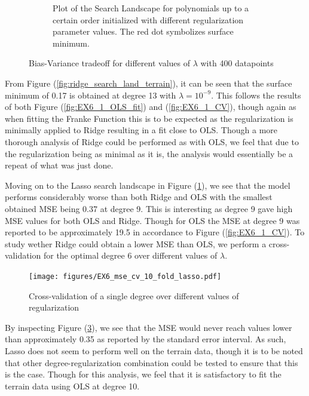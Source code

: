 \documentclass[11pt, a4paper]{article}
\begin{document}
\begin{figure}
\begin{subfigure}{0.49\textwidth}
    \caption{\label{fig:lasso_search_land_terrain}Plot of the Search Landscape for polynomials up to a certain order initialized with different regularization parameter values. The red dot symbolizes surface minimum.}
\end{subfigure}
  \caption{\label{sfig:search_land_terrain}Bias-Variance tradeoff for different values of $\lambda$ with 400 datapoints}
\end{figure}

From Figure (\ref{fig:ridge_search_land_terrain}), it can be seen that the surface minimum of 0.17 is obtained at degree 13 with $\lambda = 10^{-9}$. This follows the results of both Figure (\ref{fig:EX6_1_OLS_fit}) and (\ref{fig:EX6_1_CV}), though again as when fitting the Franke Function this is to be expected as the regularization is minimally applied to Ridge resulting in a fit close to OLS. Though a more thorough analysis of Ridge could be performed as with OLS, we feel that due to the regularization being as minimal as it is, the analysis would essentially be a repeat of what was just done.

Moving on to the Lasso search landscape in Figure (\ref{fig:lasso_search_land_terrain}), we see that the model performs considerably worse than both Ridge and OLS with the smallest obtained MSE being 0.37 at degree 9. This is interesting as degree 9 gave high MSE values for both OLS and Ridge. Though for OLS the MSE at degree 9 was reported to be approximately 19.5 in accordance to Figure (\ref{fig:EX6_1_CV}). To study wether Ridge could obtain a lower MSE than OLS, we perform a cross-validation for the optimal degree 6 over different values of $\lambda$. 

\begin{figure}
  \centering
  \texttt{[image: figures/EX6\_mse\_cv\_10\_fold\_lasso.pdf]}
  \caption{\label{fig:lasso_cv_terrain}Cross-validation of a single degree over different values of regularization}
\end{figure}

By inspecting Figure (\ref{fig:lasso_cv_terrain}), we see that the MSE would never reach values lower than approximately 0.35 as reported by the standard error interval. As such, Lasso does not seem to perform well on the terrain data, though it is to be noted that other degree-regularization combination could be tested to ensure that this is the case. Though for this analysis, we feel that it is satisfactory to fit the terrain data using OLS at degree 10. 
\end{document}
